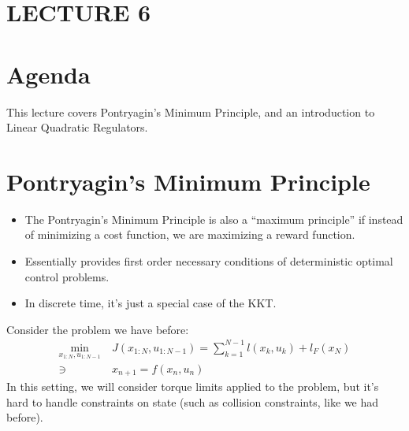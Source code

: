 \newpage
\section*{LECTURE 6}

\section{Agenda}
This lecture covers Pontryagin's Minimum Principle, and an introduction to Linear Quadratic Regulators. 

\section{Pontryagin's Minimum Principle}
\begin{itemize}
    \item The Pontryagin's Minimum Principle is also a ``maximum principle'' if instead of minimizing a cost function, we are maximizing a reward function. 
    \item Essentially provides first order necessary conditions of deterministic optimal control problems. 
    \item In discrete time, it's just a special case of the KKT. 
\end{itemize}
Consider the problem we have before: 
\begin{align}
    \min_{x_{1:N}, u_{1:N-1}} \ & J(x_{1:N}, u_{1:N-1}) = \sum_{k=1}^{N-1} l(x_k, u_k) + l_F(x_N) \\
    \ni \ & x_{n+1} = f(x_n,u_n)
\end{align}
In this setting, we will consider torque limits applied to the problem, but it's hard to handle constraints on state (such as collision constraints, like we had before). 


